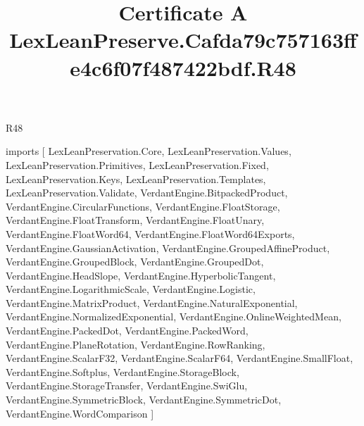 \begin{lexlean}{R48}
\title{Certificate A LexLeanPreserve.Cafda79c757163ffe4c6f07f487422bdf.R48}
\begin{coremodule}
imports [
  LexLeanPreservation.Core,
  LexLeanPreservation.Values,
  LexLeanPreservation.Primitives,
  LexLeanPreservation.Fixed,
  LexLeanPreservation.Keys,
  LexLeanPreservation.Templates,
  LexLeanPreservation.Validate,
  VerdantEngine.BitpackedProduct,
  VerdantEngine.CircularFunctions,
  VerdantEngine.FloatStorage,
  VerdantEngine.FloatTransform,
  VerdantEngine.FloatUnary,
  VerdantEngine.FloatWord64,
  VerdantEngine.FloatWord64Exports,
  VerdantEngine.GaussianActivation,
  VerdantEngine.GroupedAffineProduct,
  VerdantEngine.GroupedBlock,
  VerdantEngine.GroupedDot,
  VerdantEngine.HeadSlope,
  VerdantEngine.HyperbolicTangent,
  VerdantEngine.LogarithmicScale,
  VerdantEngine.Logistic,
  VerdantEngine.MatrixProduct,
  VerdantEngine.NaturalExponential,
  VerdantEngine.NormalizedExponential,
  VerdantEngine.OnlineWeightedMean,
  VerdantEngine.PackedDot,
  VerdantEngine.PackedWord,
  VerdantEngine.PlaneRotation,
  VerdantEngine.RowRanking,
  VerdantEngine.ScalarF32,
  VerdantEngine.ScalarF64,
  VerdantEngine.SmallFloat,
  VerdantEngine.Softplus,
  VerdantEngine.StorageBlock,
  VerdantEngine.StorageTransfer,
  VerdantEngine.SwiGlu,
  VerdantEngine.SymmetricBlock,
  VerdantEngine.SymmetricDot,
  VerdantEngine.WordComparison
]


\end{coremodule}
\end{lexlean}
